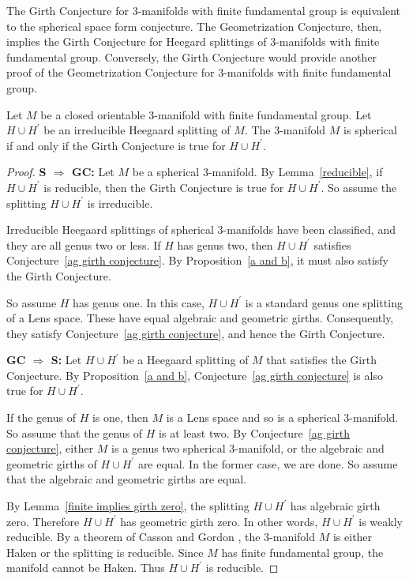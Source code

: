 The Girth Conjecture for 3-manifolds with finite fundamental group is equivalent to the spherical space form conjecture.  The Geometrization Conjecture, then, implies the Girth Conjecture for Heegard splittings of 3-manifolds with finite fundamental group.  Conversely, the Girth Conjecture would provide another proof of the Geometrization Conjecture for 3-manifolds with finite fundamental group.

\begin{proposition}
\label{finite fundamental group}
Let $M$ be a closed orientable 3-manifold with finite fundamental group.  Let $H\cup H^\prime$ be an irreducible Heegaard splitting of $M$.  The 3-manifold $M$ is spherical if and only if the Girth Conjecture is true for $H\cup H^\prime$.
\end{proposition}

\begin{proof}
\textbf{S $\Rightarrow$ GC:}  
Let $M$ be a spherical 3-manifold.  By Lemma~\ref{reducible}, if $H\cup H^{\prime}$ is reducible, then the Girth Conjecture is true for $H\cup H^{\prime}$.  So assume the splitting $H\cup H^{\prime}$ is irreducible.

Irreducible Heegaard splittings of spherical 3-manifolds have been classified, and they are all genus two or less.  If $H$ has genus two, then $H\cup H^{\prime}$ satisfies Conjecture~\ref{ag girth conjecture}.  By Proposition~\ref{a and b}, it must also satisfy the Girth Conjecture.

So assume $H$ has genus one.  In this case, $H\cup H^{\prime}$ is a standard genus one splitting of a Lens space.  These have equal algebraic and geometric girths.  Consequently, they satisfy Conjecture~\ref{ag girth conjecture}, and hence the Girth Conjecture.

\textbf{GC $\Rightarrow$ S:}  
Let $H\cup H^{\prime}$ be a Heegaard splitting of $M$ that satisfies the Girth Conjecture.  By Proposition~\ref{a and b}, Conjecture~\ref{ag girth conjecture} is also true for $H\cup H^{\prime}$.

If the genus of $H$ is one, then $M$ is a Lens space and so is a spherical 3-manifold.  So assume that the genus of $H$ is at least two.  By Conjecture~\ref{ag girth conjecture}, either $M$ is a genus two spherical 3-manifold, or the algebraic and geometric girths of $H\cup H^\prime$ are equal.  In the former case, we are done.  So assume that the algebraic and geometric girths are equal.

By Lemma~\ref{finite implies girth zero}, the splitting $H\cup H^{\prime}$ has algebraic girth zero.  Therefore $H\cup H^{\prime}$ has geometric girth zero.  In other words, $H\cup H^\prime$ is weakly reducible.  By a theorem of Casson and Gordon \cite{CG}, the 3-manifold $M$ is either Haken or the splitting is 
reducible.  Since $M$ has finite fundamental group, the manifold cannot 
be Haken.  Thus $H\cup H^\prime$ is reducible.
\end{proof}

